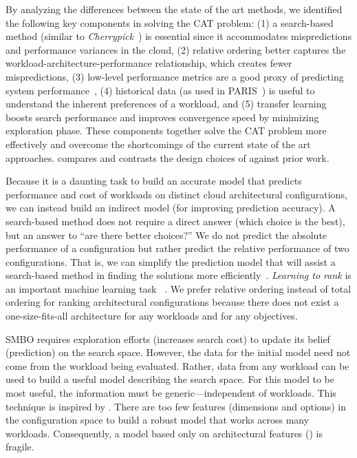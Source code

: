 By analyzing the differences between the state of the art methods,
we identified the following key components in solving the CAT problem:
(1) a search-based method (similar to \emph{Cherrypick}~\cite{Alipourfard2017})
is essential since it accommodates mispredictions and performance variances
in the cloud,
(2) relative ordering better captures
the workload-architecture-performance relationship,
which creates fewer mispredictions,
(3) low-level performance metrics are a good proxy of
predicting system performance~\cite{Novakovic2013,Hsu2016,Yadwadkar2017},
(4) historical data (as used in PARIS~\cite{Yadwadkar2017}) is useful
to understand the inherent preferences of a workload, and
(5) transfer learning boosts search performance and improves convergence speed
by minimizing exploration phase.
These components together solve the CAT problem more effectively
and overcome the shortcomings of the current state of the art approaches.
\myfigure{\ref{fig:model_classification}} compares and contrasts the
design choices of \scout against prior work.

Because it is a daunting task to build an accurate model that
predicts performance and cost of workloads on
distinct cloud architectural configurations,
we can instead build an indirect model (for improving prediction accuracy).
A search-based method does not require a direct answer
(which choice is the best),
but an answer to ``are there better choices?''
We do not predict the absolute performance of a configuration but rather
predict the relative performance of two configurations.
That is, we can simplify the prediction model that will assist
a search-based method in finding the solutions more efficiently~\cite{nair2017}.
\emph{Learning to rank} is an important machine learning task
~\cite{harrell2001ordinal,li2008mcrank,cao2007learning}.
We prefer relative ordering instead of total ordering for
ranking architectural configurations because
there does not exist a one-size-fits-all architecture
for any workloads and for any objectives.

SMBO requires exploration efforts
(increases search cost)
to update its belief (prediction) on the search space.
However, the data for the initial model need not come from
the workload being evaluated.
Rather, data from any workload can be used to build a useful model describing
the search space.
For this model to be most useful, the information must be generic---independent
of workloads.
This technique is inspired by \cite{Hsu2016,Yadwadkar2017}.
There are too few features (dimensions and options) in the configuration space
to build a robust model that works across many workloads.
Consequently, a model based only on architectural features
() is fragile.

